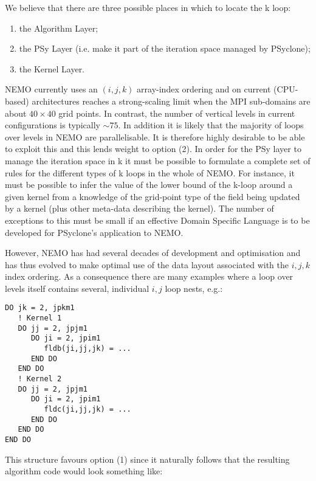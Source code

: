 \documentclass{article}
\begin{document}
We believe that there are three possible places in which to locate the
k loop:

\begin{enumerate}

\item the Algorithm Layer;

\item the PSy Layer (i.e. make it part of the iteration space managed
  by PSyclone);

\item the Kernel Layer.

\end{enumerate}

NEMO currently uses an $(i,j,k)$ array-index ordering and on current
(CPU-based) architectures reaches a strong-scaling limit when the MPI
sub-domains are about $40\times 40$ grid points. In contrast, the
number of vertical levels in current configurations is typically
$\sim75$. In addition it is likely that the majority of loops over
levels in NEMO are parallelisable. It is therefore highly desirable to
be able to exploit this and this lends weight to option (2). In order
for the PSy layer to manage the iteration space in k it must be
possible to formulate a complete set of rules for the different types
of k loops in the whole of NEMO. For instance, it must be possible to
infer the value of the lower bound of the k-loop around a given kernel
from a knowledge of the grid-point type of the field being updated by
a kernel (plus other meta-data describing the kernel). The number of
exceptions to this must be small if an effective Domain Specific
Language is to be developed for PSyclone's application to NEMO.

However, NEMO has had several decades of development and optimisation
and has thus evolved to make optimal use of the data layout associated
with the $i,j,k$ index ordering. As a consequence there are many
examples where a loop over levels itself contains several, individual
$i,j$ loop nests, e.g.:

\begin{verbatim}
DO jk = 2, jpkm1
   ! Kernel 1
   DO jj = 2, jpjm1
      DO ji = 2, jpim1
         fldb(ji,jj,jk) = ...
      END DO
   END DO
   ! Kernel 2
   DO jj = 2, jpjm1
      DO ji = 2, jpim1
         fldc(ji,jj,jk) = ...
      END DO
   END DO
END DO
\end{verbatim}

This structure favours option (1) since it naturally follows that the
resulting algorithm code would look something like:
\end{document}
